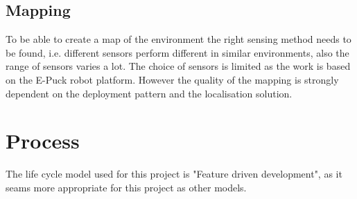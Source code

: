 \subsection{Mapping}
To be able to create a map of the environment the right sensing method needs to be found, i.e. different sensors perform different in similar environments, also the range of sensors varies a lot. 
The choice of sensors is limited as the work is based on the E-Puck robot platform.
However the quality of the mapping is strongly dependent on the deployment pattern and the localisation solution.

\section{Process}
The life cycle model used for this project is "Feature driven development", as it seams more appropriate for this project as other models. 

